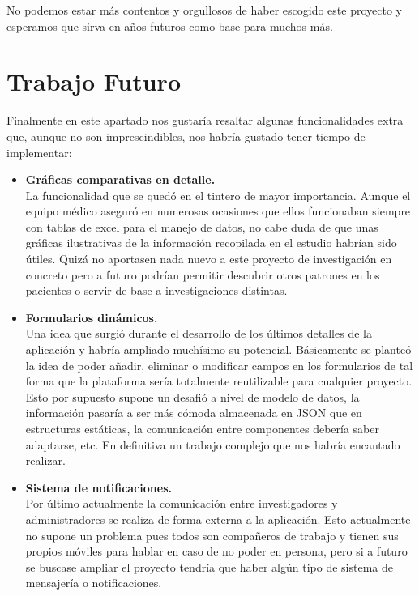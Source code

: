     No podemos estar más contentos y orgullosos de haber escogido este proyecto y esperamos que sirva en años futuros como base para muchos más. \newpage
    
     \section{Trabajo Futuro}
     
      Finalmente en este apartado nos gustaría resaltar algunas funcionalidades extra que, aunque no son imprescindibles, nos habría gustado tener tiempo de implementar:
 \newline
 
 \begin{itemize}
  \item\textbf{Gráficas comparativas en detalle.} \\
  La funcionalidad que se quedó en el tintero de mayor importancia. Aunque el equipo médico aseguró en numerosas ocasiones que ellos funcionaban siempre con tablas de excel para el manejo de datos, no cabe duda de que unas gráficas ilustrativas de la información recopilada en el estudio habrían sido útiles. Quizá no aportasen nada nuevo a este proyecto de investigación en concreto pero a futuro podrían permitir descubrir otros patrones en los pacientes o servir de base a investigaciones distintas. \\
  
  \item\textbf{Formularios dinámicos.} \\
  Una idea que surgió durante el desarrollo de los últimos detalles de la aplicación y habría ampliado muchísimo su potencial. Básicamente se planteó la idea de poder añadir, eliminar o modificar campos en los formularios de tal forma que la plataforma sería totalmente reutilizable para cualquier proyecto. Esto por supuesto supone un desafió a nivel de modelo de datos, la información pasaría a ser más cómoda almacenada en JSON que en estructuras estáticas, la comunicación entre componentes debería saber adaptarse, etc. En definitiva un trabajo complejo que nos habría encantado realizar. \\
  
  \item\textbf{Sistema de notificaciones.} \\
  Por último actualmente la comunicación entre investigadores y administradores se realiza de forma externa a la aplicación. Esto actualmente no supone un problema pues todos son compañeros de trabajo y tienen sus propios móviles para hablar en caso de no poder en persona, pero si a futuro se buscase ampliar el proyecto tendría que haber algún tipo de sistema de mensajería o notificaciones. 
  \newline
  

\end{itemize}
